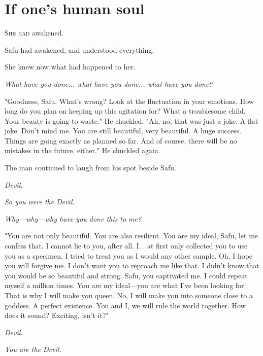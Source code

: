 
\chapter{If one's human soul}


\lettrine{S}{he had} awakened.

Safu had awakened, and understood everything.

She knew now what had happened to her.

\emph{What have you done... what have you done... what have you done?}

"Goodness, Safu. What's wrong? Look at the fluctuation in your emotions.
How long do you plan on keeping up this agitation for? What a
troublesome child. Your beauty is going to waste." He chuckled. "Ah, no,
that was just a joke. A flat joke. Don't mind me. You are still
beautiful, very beautiful. A huge success. Things are going exactly as
planned so far. And of course, there will be no mistakes in the future,
either." He chuckled again.

The man continued to laugh from his spot beside Safu.

\emph{Devil.}

\emph{So you were the Devil.}

\emph{Why---why---why have you done this to me?}

"You are not only beautiful. You are also resilient. You are my ideal,
Safu, let me confess that. I cannot lie to you, after all. I... at first
only collected you to use you as a specimen. I tried to treat you as I
would any other sample. Oh, I hope you will forgive me. I don't want you
to reproach me like that. I didn't know that you would be so beautiful
and strong. Safu, you captivated me. I could repeat myself a million
times. You are my ideal---you are what I've been looking for. That is why
I will make you queen. No, I will make you into someone close to a
goddess. A perfect existence. You and I, we will rule the world
together. How does it sound? Exciting, isn't it?"

\emph{Devil.}

\emph{You are the Devil.}

